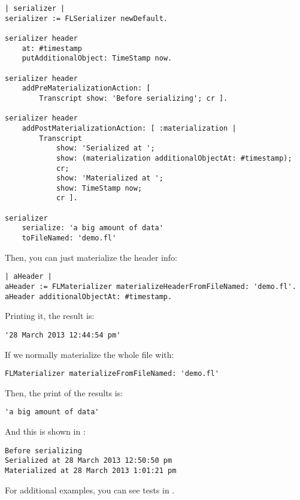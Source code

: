 \documentclass[a4paper,10pt,twoside]{book}
\begin{document}
\begin{lstlisting}
| serializer |
serializer := FLSerializer newDefault.

serializer header 
	at: #timestamp
	putAdditionalObject: TimeStamp now.

serializer header
	addPreMaterializationAction: [ 
		Transcript show: 'Before serializing'; cr ].

serializer header
	addPostMaterializationAction: [ :materialization | 
		Transcript 
			show: 'Serialized at ';
			show: (materialization additionalObjectAt: #timestamp); 
			cr;
			show: 'Materialized at ';
			show: TimeStamp now; 
			cr ].
	
serializer 
	serialize: 'a big amount of data' 
	toFileNamed: 'demo.fl'
\end{lstlisting}

Then, you can just materialize the header info:

\begin{lstlisting}
| aHeader |
aHeader := FLMaterializer materializeHeaderFromFileNamed: 'demo.fl'.
aHeader additionalObjectAt: #timestamp.
\end{lstlisting}

Printing it, the result is:

\begin{lstlisting}
'28 March 2013 12:44:54 pm'
\end{lstlisting}

If we normally materialize the whole file with:

\begin{lstlisting}
FLMaterializer materializeFromFileNamed: 'demo.fl' 
\end{lstlisting}

Then, the print of the results is:

\begin{lstlisting}
'a big amount of data'
\end{lstlisting}

And this is shown in :

\begin{lstlisting}
Before serializing
Serialized at 28 March 2013 12:50:50 pm
Materialized at 28 March 2013 1:01:21 pm
\end{lstlisting}
 
For additional examples, you can see tests in .
\ifx\wholebook\relax\else
   
\end{document}
